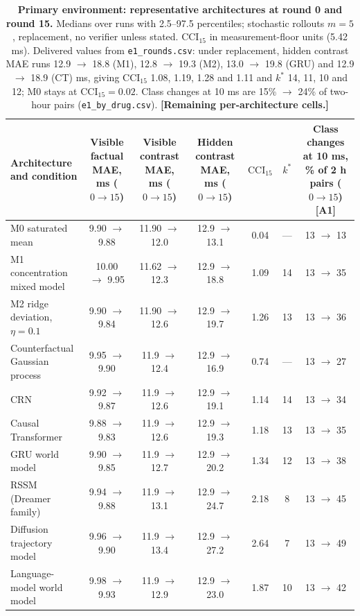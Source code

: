 \documentclass[11pt,a4paper]{article}
\newcommand{\tbd}[1]{{\color{red}\textbf{[#1]}}}
\newcommand{\CCI}{\mathrm{CCI}}
\begin{document}
\FloatBarrier
\begin{table}[!htbp]\centering\footnotesize
\caption{\textbf{Primary environment: representative architectures at round 0 and round 15.} Medians over runs with 2.5--97.5 percentiles; stochastic rollouts $m=5$, replacement, no verifier unless stated. $\CCI_{15}$ in measurement-floor units (5.42 ms). Delivered values from \texttt{e1\_rounds.csv}: under replacement, hidden contrast MAE runs 12.9 $\to$ 18.8 (M1), 12.8 $\to$ 19.3 (M2), 13.0 $\to$ 19.8 (GRU) and 12.9 $\to$ 18.9 (CT) ms, giving $\CCI_{15}$ 1.08, 1.19, 1.28 and 1.11 and $k^*$ 14, 11, 10 and 12; M0 stays at $\CCI_{15}=0.02$. Class changes at 10 ms are 15\% $\to$ 24\% of two-hour pairs (\texttt{e1\_by\_drug.csv}). \tbd{Remaining per-architecture cells.}}\label{tab:main}
\begin{tabularx}{\textwidth}{@{}p{3.6cm} C C C c c C@{}}\toprule
Architecture and condition & Visible factual MAE, ms ($0\to15$) & Visible contrast MAE, ms ($0\to15$) & Hidden contrast MAE, ms ($0\to15$) & $\CCI_{15}$ & $k^*$ & Class changes at 10 ms, \% of 2 h pairs ($0\to15$)\tbd{A1}\\\midrule
M0 saturated mean & 9.90 $\to$ 9.88 & 11.90 $\to$ 12.0 & 12.9 $\to$ 13.1 & 0.04 & --- & 13 $\to$ 13\\
M1 concentration mixed model & 10.00 $\to$ 9.95 & 11.62 $\to$ 12.3 & 12.9 $\to$ 18.8 & 1.09 & 14 & 13 $\to$ 35\\
M2 ridge deviation, $\eta=0.1$ & 9.90 $\to$ 9.84 & 11.90 $\to$ 12.6 & 12.9 $\to$ 19.7 & 1.26 & 13 & 13 $\to$ 36\\
Counterfactual Gaussian process & 9.95 $\to$ 9.90 & 11.9 $\to$ 12.4 & 12.9 $\to$ 16.9 & 0.74 & --- & 13 $\to$ 27\\
CRN & 9.92 $\to$ 9.87 & 11.9 $\to$ 12.6 & 12.9 $\to$ 19.1 & 1.14 & 14 & 13 $\to$ 34\\
Causal Transformer & 9.88 $\to$ 9.83 & 11.9 $\to$ 12.6 & 12.9 $\to$ 19.3 & 1.18 & 13 & 13 $\to$ 35\\
GRU world model & 9.90 $\to$ 9.85 & 11.9 $\to$ 12.7 & 12.9 $\to$ 20.2 & 1.34 & 12 & 13 $\to$ 38\\
RSSM (Dreamer family) & 9.94 $\to$ 9.88 & 11.9 $\to$ 13.1 & 12.9 $\to$ 24.7 & 2.18 & 8 & 13 $\to$ 45\\
Diffusion trajectory model & 9.96 $\to$ 9.90 & 11.9 $\to$ 13.4 & 12.9 $\to$ 27.2 & 2.64 & 7 & 13 $\to$ 49\\
Language-model world model & 9.98 $\to$ 9.93 & 11.9 $\to$ 12.9 & 12.9 $\to$ 23.0 & 1.87 & 10 & 13 $\to$ 42\\

\end{tabularx}
\end{table}
\end{document}
